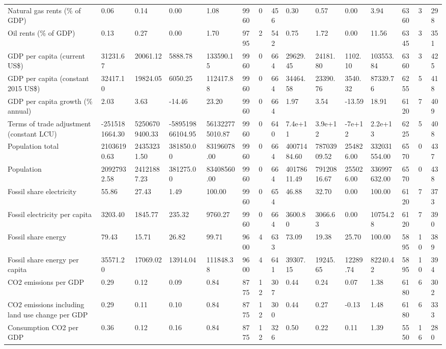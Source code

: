 \begin{longtable}{lllllllllllllll}
\addlinespace
Natural gas rents (\% of GDP) & 0.06 & 0.14 & 0.00 & 1.08 & 9960 & 0 & 456 & 0.30 & 0.57 & 0.00 & 3.94 & 6360 & 3 & 298\\
Oil rents (\% of GDP) & 0.13 & 0.27 & 0.00 & 1.70 & 9795 & 2 & 542 & 0.75 & 1.72 & 0.00 & 11.56 & 6345 & 3 & 351\\
GDP per capita (current US\$) & 31231.67 & 20061.12 & 5888.78 & 133590.15 & 9960 & 0 & 664 & 29629.45 & 24181.80 & 1102.10 & 103553.84 & 6360 & 3 & 425\\
GDP per capita (constant 2015 US\$) & 32417.10 & 19824.05 & 6050.25 & 112417.88 & 9960 & 0 & 664 & 34464.58 & 23390.76 & 3540.32 & 87339.76 & 6255 & 5 & 418\\
GDP per capita growth (\% annual) & 2.03 & 3.63 & -14.46 & 23.20 & 9960 & 0 & 664 & 1.97 & 3.54 & -13.59 & 18.91 & 6120 & 7 & 409\\
\addlinespace
Terms of trade adjustment (constant LCU) & -2515181664.30 & 52506709400.33 & -589519866104.95 & 561322775010.87 & 9960 & 0 & 640 & 7.4e+11 & 3.9e+12 & -7e+12 & 2.2e+13 & 6225 & 5 & 408\\
Population total & 21036190.63 & 24353231.50 & 381850.00 & 83196078.00 & 9960 & 0 & 664 & 40071484.60 & 78703909.52 & 254826.00 & 332031554.00 & 6570 & 0 & 437\\
Population & 20927932.58 & 24121887.23 & 381275.00 & 83408560.00 & 9960 & 0 & 664 & 40178611.49 & 79120816.67 & 255026.00 & 336997632.00 & 6570 & 0 & 438\\
Fossil share electricity & 55.86 & 27.43 & 1.49 & 100.00 & 9960 & 0 & 654 & 46.88 & 32.70 & 0.00 & 100.00 & 6120 & 7 & 373\\
Fossil electricity per capita & 3203.40 & 1845.77 & 235.32 & 9760.27 & 9960 & 0 & 664 & 3600.80 & 3066.63 & 0.00 & 10754.28 & 6120 & 7 & 390\\
\addlinespace
Fossil share energy & 79.43 & 15.71 & 26.82 & 99.71 & 9600 & 4 & 633 & 73.09 & 19.38 & 25.70 & 100.00 & 5895 & 10 & 389\\
Fossil share energy per capita & 35571.20 & 17069.02 & 13914.04 & 111848.38 & 9600 & 4 & 641 & 39307.15 & 19245.65 & 12289.74 & 82240.42 & 5895 & 10 & 394\\
CO2 emissions per GDP & 0.29 & 0.12 & 0.09 & 0.84 & 8775 & 12 & 307 & 0.44 & 0.24 & 0.07 & 1.38 & 6180 & 6 & 302\\
CO2 emissions including land use change per GDP & 0.29 & 0.11 & 0.10 & 0.84 & 8775 & 12 & 300 & 0.44 & 0.27 & -0.13 & 1.48 & 6180 & 6 & 333\\
Consumption CO2 per GDP & 0.36 & 0.12 & 0.16 & 0.84 & 8775 & 12 & 326 & 0.50 & 0.22 & 0.11 & 1.39 & 5550 & 16 & 280\\

\end{longtable}
